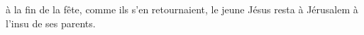 \encetemps à la fin de la fête, comme ils s’en retournaient,
	le jeune Jésus resta à Jérusalem à l’insu de ses parents.
